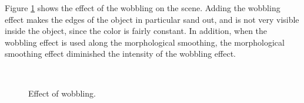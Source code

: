 \documentclass{article}
\begin{document}
\medskip \par
\noindent
Figure \ref{fig:wobbling_results} shows the effect of the wobbling on the scene. Adding the wobbling effect makes the edges of the object in particular sand out, and is not very visible inside the object, since the color is fairly constant. In addition, when the wobbling effect is used along the morphological smoothing, the morphological smoothing effect diminished the intensity of the wobbling effect.

\begin{figure}[h]
	\centering
	\hspace{1em}
	 \\
	\hspace{1em}
	\caption{Effect of wobbling.}
	\label{fig:wobbling_results}
\end{figure}
\end{document}
